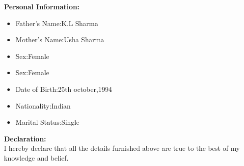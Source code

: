 \documentclass[10pt,a4paper]{article}
\begin{document}
\begin{flushleft}
		 \textbf{Personal Information:}\\
		 
		 \begin{itemize}
		 	\item Father's Name:K.L Sharma\\
		 	\item Mother's Name:Usha Sharma\\
		 	\item Sex:Female\\
		 	\item Sex:Female\\
		 	\item Date of Birth:25th october,1994\\
		 	\item Nationality:Indian\\
		 	\item Marital Status:Single\\
		 \end{itemize}
		   \textbf{ Declaration: }\\
		   I hereby declare that all the details furnished above are true to the best of my knowledge and belief.
		   \medskip
	
\end{flushleft}

 
\end{document}
